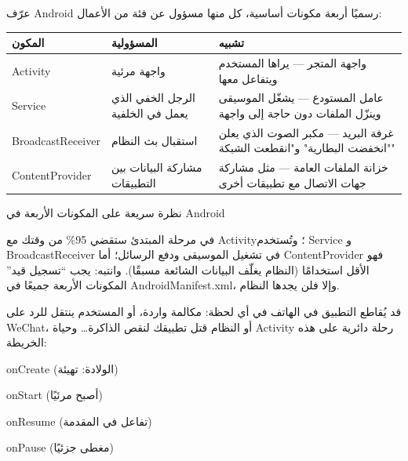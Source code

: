 


عرّف Android رسميًا أربعة مكونات أساسية، كل منها مسؤول عن فئة من الأعمال:

\begin{center}
\begin{tabularx}{\linewidth}{|X|X|X|}
\hline
\textbf{المكون} & \textbf{المسؤولية} & \textbf{تشبيه} \tabularnewline
\hline
Activity & واجهة مرئية & واجهة المتجر — يراها المستخدم ويتفاعل معها \tabularnewline
Service & الرجل الخفي الذي يعمل في الخلفية & عامل المستودع — يشغّل الموسيقى وينزّل الملفات دون حاجة إلى واجهة \tabularnewline
BroadcastReceiver & استقبال بث النظام & غرفة البريد — مكبر الصوت الذي يعلن "انخفضت البطارية" و"انقطعت الشبكة" \tabularnewline
ContentProvider & مشاركة البيانات بين التطبيقات & خزانة الملفات العامة — مثل مشاركة جهات الاتصال مع تطبيقات أخرى \tabularnewline
\hline
\end{tabularx}
\end{center}

\begin{center}\small\color{gray}نظرة سريعة على المكونات الأربعة في Android\end{center}

في مرحلة المبتدئ ستقضي 95\% من وقتك مع Activity؛ وتُستخدم Service و BroadcastReceiver في تشغيل الموسيقى ودفع الرسائل؛ أما ContentProvider فهو الأقل استخدامًا (النظام يغلّف البيانات الشائعة مسبقًا). وانتبه: يجب “تسجيل قيد” المكونات الأربعة جميعًا في AndroidManifest.xml، وإلا فلن يجدها النظام.


قد يُقاطع التطبيق في الهاتف في أي لحظة: مكالمة واردة، أو المستخدم ينتقل للرد على WeChat، أو النظام قتل تطبيقك لنقص الذاكرة… وحياة Activity رحلة دائرية على هذه الخريطة:

onCreate (الولادة: تهيئة)

onStart (أصبح مرئيًا)

onResume (تفاعل في المقدمة)

onPause (مغطى جزئيًا)

